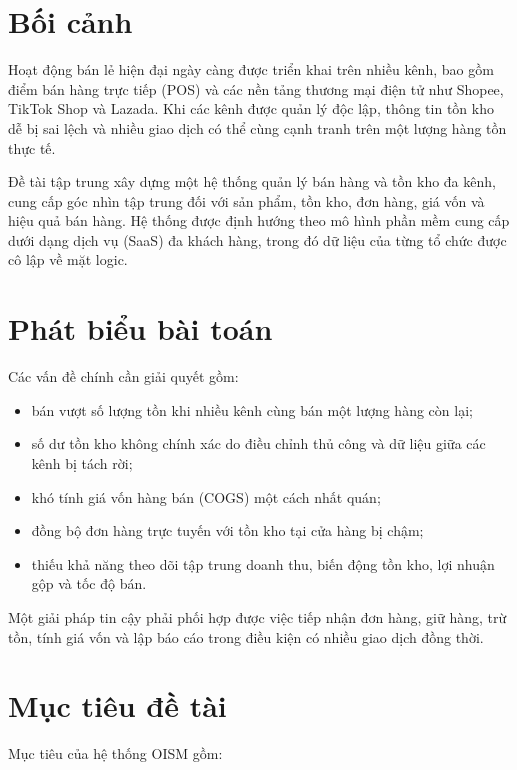 \section{Bối cảnh}

Hoạt động bán lẻ hiện đại ngày càng được triển khai trên nhiều kênh, bao gồm điểm bán hàng
trực tiếp (POS) và các nền tảng thương mại điện tử như Shopee, TikTok Shop và Lazada. Khi
các kênh được quản lý độc lập, thông tin tồn kho dễ bị sai lệch và nhiều giao dịch có thể
cùng cạnh tranh trên một lượng hàng tồn thực tế.

Đề tài tập trung xây dựng một hệ thống quản lý bán hàng và tồn kho đa kênh, cung cấp góc
nhìn tập trung đối với sản phẩm, tồn kho, đơn hàng, giá vốn và hiệu quả bán hàng. Hệ thống
được định hướng theo mô hình phần mềm cung cấp dưới dạng dịch vụ (SaaS) đa khách hàng,
trong đó dữ liệu của từng tổ chức được cô lập về mặt logic.

\section{Phát biểu bài toán}

Các vấn đề chính cần giải quyết gồm:

\begin{itemize}
    \item bán vượt số lượng tồn khi nhiều kênh cùng bán một lượng hàng còn lại;
    \item số dư tồn kho không chính xác do điều chỉnh thủ công và dữ liệu giữa các kênh bị tách rời;
    \item khó tính giá vốn hàng bán (COGS) một cách nhất quán;
    \item đồng bộ đơn hàng trực tuyến với tồn kho tại cửa hàng bị chậm;
    \item thiếu khả năng theo dõi tập trung doanh thu, biến động tồn kho, lợi nhuận gộp và tốc độ bán.
\end{itemize}

Một giải pháp tin cậy phải phối hợp được việc tiếp nhận đơn hàng, giữ hàng, trừ tồn,
tính giá vốn và lập báo cáo trong điều kiện có nhiều giao dịch đồng thời.

\section{Mục tiêu đề tài}

Mục tiêu của hệ thống OISM gồm:

